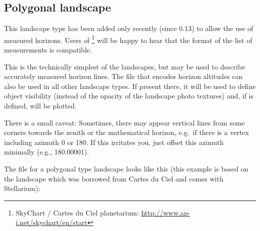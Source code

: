 \subsection{Polygonal landscape}
\label{sec:landscapes:Polygonal}

This landscape type has been added only recently (since 0.13) to allow
the use of measured horizons. Users of \footnote{SkyChart / Cartes du Ciel planetarium:
  \url{http://www.ap-i.net/skychart/en/start}} will be happy to hear
that the format of the list of measurements is compatible.

This is the technically simplest of the landscapes, but may be used to
describe accurately measured horizon lines. The file that encodes
horizon altitudes can also be used in all other landscape types. If
present there, it will be used to define object visibility (instead of
the opacity of the landscape photo textures) and, if
 is defined, will be plotted.

There is a small caveat: Sometimes, there may appear vertical lines
from some corners towards the zenith or the mathematical horizon,
e.g.\ if there is a vertex including azimuth 0 or 180. If this
irritates you, just offset this azimuth minimally (e.g., 180.00001).

The  file for a polygonal type landscape looks
like this (this example is based on the  landscape
which was borrowed from Cartes du Ciel and comes with Stellarium):

